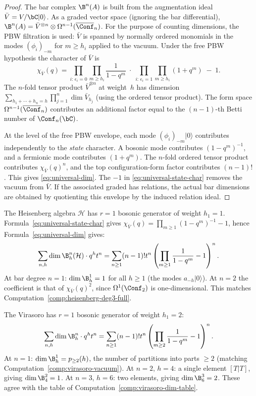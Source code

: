 \begin{proof}
The bar complex $\B^n(A)$ is built from the augmentation ideal
$\bar{V} = V / \bC|0\rangle$. As a graded vector space (ignoring
the bar differential), $\B^n(A) = \bar{V}^{\otimes n} \otimes
\Omega^{n-1}(\overline{\Conf}_n)$. For the purpose of
counting dimensions, the PBW filtration is used: $\bar{V}$ is
spanned by normally ordered monomials in the modes
$(\phi_i)_{-m}$ for $m \geq h_i$ applied to the vacuum.
Under the free PBW hypothesis the character of $\bar{V}$ is
\[
\chi_{\bar{V}}(q) = \prod_{i:\,\epsilon_i = 0}
 \prod_{m \geq h_i} \frac{1}{1 - q^m}
\;\cdot\; \prod_{i:\,\epsilon_i = 1}
 \prod_{m \geq h_i} (1 + q^m) \;-\; 1.
\]
The $n$-fold tensor product $\bar{V}^{\otimes n}$ at weight~$h$
has dimension $\sum_{h_1 + \cdots + h_n = h}
\prod_{j=1}^n \dim \bar{V}_{h_j}$ (using the ordered tensor product).
The form space $\Omega^{n-1}(\overline{\Conf}_n)$ contributes
an additional factor equal to the $(n-1)$-th Betti number of
$\Conf_n(\bC)$.

At the level of the free PBW envelope, each mode
$(\phi_i)_{-m}|0\rangle$ contributes independently to the
\emph{state} character. A bosonic mode contributes $(1-q^m)^{-1}$,
and a fermionic mode contributes $(1+q^m)$. The $n$-fold ordered
tensor product contributes $\chi_{\bar V}(q)^n$, and the top
configuration-form factor contributes $(n-1)!$. This gives
\eqref{eq:universal-dim}. The $-1$ in
\eqref{eq:universal-state-char} removes the vacuum from $\bar V$.
If the associated graded has relations, the actual bar dimensions are
obtained by quotienting this envelope by the induced relation ideal.
\end{proof}

\begin{computation}\label{comp:dim-formula-heisenberg}
The Heisenberg algebra $\mathcal{H}$ has $r = 1$ bosonic generator
of weight $h_1 = 1$. Formula~\eqref{eq:universal-state-char} gives
$\chi_{\bar V}(q)=\prod_{m\ge1}(1-q^m)^{-1}-1$, hence
Formula~\eqref{eq:universal-dim} gives:
\[
\sum_{n,h} \dim \B^n_h(\mathcal{H}) \cdot q^h t^n
= \sum_{n\ge1}(n-1)!t^n
\left(\prod_{m\ge1}\frac1{1-q^m}-1\right)^n .
\]
At bar degree $n = 1$: $\dim \B^1_h = 1$ for all $h \geq 1$
(the modes $a_{-h}|0\rangle$). At $n = 2$ the coefficient is that of
$\chi_{\bar V}(q)^2$, since $\Omega^1(\Conf_2)$ is one-dimensional.
This matches
Computation~\ref{comp:heisenberg-deg3-full}.
\end{computation}

\begin{computation}\label{comp:dim-formula-virasoro}
The Virasoro has $r = 1$ bosonic generator of weight $h_1 = 2$:
\[
\sum_{n,h} \dim \B^n_h \cdot q^h t^n
= \sum_{n\ge1}(n-1)!t^n
\left(\prod_{m\ge2}\frac1{1-q^m}-1\right)^n .
\]
At $n = 1$:
$\dim \B^1_h = p_{\geq 2}(h)$, the number of partitions into parts
$\geq 2$ (matching Computation~\ref{comp:virasoro-vacuum}).
At $n = 2$, $h = 4$: a single element $[T|T]$,
giving $\dim \B^2_4 = 1$.
At $n = 3$, $h = 6$: two elements, giving $\dim \B^3_6 = 2$.
These agree with the table of Computation~\ref{comp:virasoro-dim-table}.
\end{computation}

